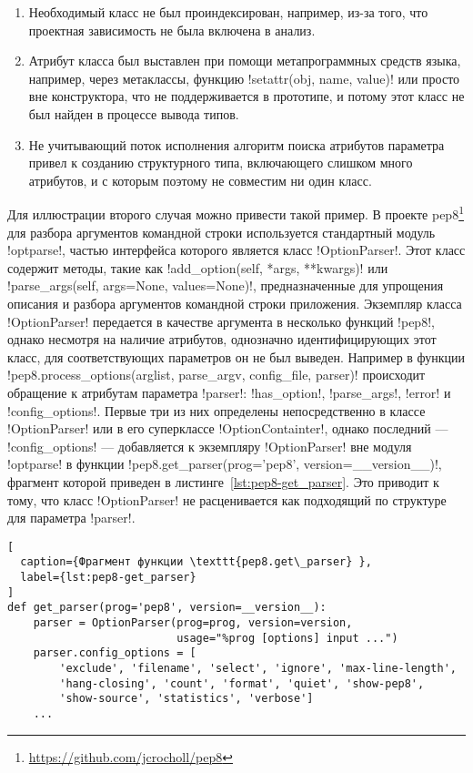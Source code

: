 \begin{enumerate}
    \item Необходимый класс не был проиндексирован, например, из-за того, что
      проектная зависимость не была включена в анализ.

    \item Атрибут класса был выставлен при помощи метапрограммных средств языка,
      например, через метаклассы, функцию !setattr(obj, name, value)! или просто
      вне конструктора, что не поддерживается в прототипе, и потому этот класс не был
      найден в процессе вывода типов.

    \item Не учитывающий поток исполнения алгоритм поиска атрибутов параметра
      привел к созданию структурного типа, включающего слишком много
      атрибутов, и с которым поэтому не совместим ни один класс.

\end{enumerate}

Для иллюстрации второго случая можно привести такой пример. В проекте
pep8\footnote{\url{https://github.com/jcrocholl/pep8}} для разбора аргументов
командной строки используется стандартный модуль !optparse!, частью интерфейса
которого является класс !OptionParser!. Этот класс содержит методы, такие как
!add_option(self, *args, **kwargs)! или !parse_args(self, args=None, values=None)!, 
предназначенные для упрощения описания и разбора аргументов командной строки
приложения. Экземпляр класса !OptionParser! передается в качестве аргумента в
несколько функций !pep8!, однако несмотря на наличие атрибутов, однозначно
идентифицирующих этот класс, для соответствующих параметров он не был выведен.
Например в функции !pep8.process_options(arglist, parse_argv, config_file, parser)!
происходит обращение к атрибутам параметра
!parser!: !has_option!, !parse_args!, !error! и !config_options!. Первые три из
них определены непосредственно в классе !OptionParser! или в его суперклассе
!OptionContainter!, однако последний --- !config_options! --- добавляется к
экземпляру !OptionParser! вне модуля !optparse! в функции
!pep8.get_parser(prog='pep8', version=__version__)!, фрагмент которой приведен в
листинге~\ref{lst:pep8-get_parser}. Это приводит к тому, что класс
!OptionParser! не расценивается как подходящий по структуре для параметра
!parser!.

\begin{lstlisting}[
  caption={Фрагмент функции \texttt{pep8.get\_parser} }, 
  label={lst:pep8-get_parser} 
]
def get_parser(prog='pep8', version=__version__):
    parser = OptionParser(prog=prog, version=version,
                          usage="%prog [options] input ...")
    parser.config_options = [
        'exclude', 'filename', 'select', 'ignore', 'max-line-length',
        'hang-closing', 'count', 'format', 'quiet', 'show-pep8',
        'show-source', 'statistics', 'verbose']
    ...
\end{lstlisting}

